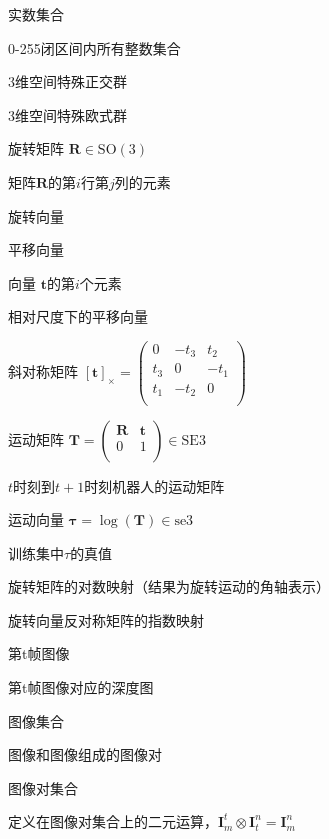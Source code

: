 \item[$\mathbb{R}$] 实数集合
\item[$\mathbb{I}$] 0-255闭区间内所有整数集合 
\item[$\text{SO}(3)$] 3维空间特殊正交群
\item[$\text{SE}(3)$] 3维空间特殊欧式群 
\item[$\mathbf{R}$] 旋转矩阵 $\mathbf{R} \in \text{SO}(3)$
\item[$\mathbf{R}_{ij}$] 矩阵$\mathbf{R}$的第$i$行第$j$列的元素
\item[$\mathbf{r}$] 旋转向量 
\item[$\mathbf{t}$] 平移向量
\item[$\mathbf{t}_i$]  向量 $\mathbf{t}$的第$i$个元素
\item[$\mathbf{\bar{t}}$] 相对尺度下的平移向量
\item[$\mathbf{[t]}_\times$] 斜对称矩阵 $\mathbf{[t]}_\times = \begin{pmatrix}
    0  & -t_3& t_2 \\
    t_3& 0   & -t_1\\
    t_1& -t_2& 0   \\
\end{pmatrix}$
\item[$\mathbf{T}$] 运动矩阵 $\mathbf{T} = \begin{pmatrix}
    \mathbf{R}&  \mathbf{t}\\
    0&  1\\
\end{pmatrix} \in \text{SE3}$  
\item[$\mathbf{T}_{t}^{t+1}$] $t$时刻到$t+1$时刻机器人的运动矩阵
\item[$\mathbf{\tau}$] 运动向量 $\mathbf{\tau} = \log(\mathbf{T}) \in \text{se3} $
\item[$\mathbf{\underline{\tau}}$] 训练集中$\tau$的真值
\item[$\log(\mathbf{R})$] 旋转矩阵的对数映射（结果为旋转运动的角轴表示）
\item[$\exp(\mathbf{r})$] 旋转向量反对称矩阵的指数映射 
\item[$\mathbf{I}^t$] 第t帧图像
\item[$\mathbf{D}^t$] 第t帧图像对应的深度图
\item[$\Omega_{\mathbf{I}}$] 图像集合
\item[$\mathbf{I}_m^n$]  图像和图像组成的图像对
\item[$\Omega_{\mathbf{I}_m^n}$] 图像对集合
\item[$\otimes$] 定义在图像对集合上的二元运算，$\mathbf{I}_m^t \otimes \mathbf{I}_t^n= \mathbf{I}_m^n$
